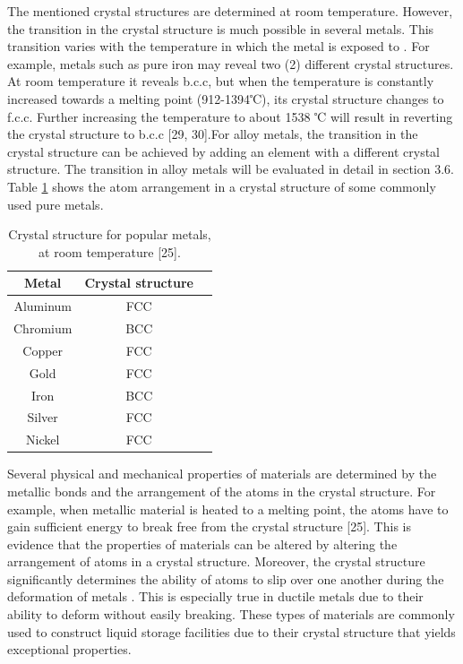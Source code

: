 \documentclass[12pt]{report}
\begin{document}
The mentioned crystal structures are determined at room temperature.  However, the transition in the crystal structure is much possible in several metals. This transition varies with the temperature in which the metal is exposed to \cite{callister2018materials}. For example, metals such as pure iron may reveal two (2) different crystal structures. At room temperature it reveals b.c.c, but when the temperature is constantly increased towards a melting point (912-1394℃), its crystal structure changes to f.c.c. Further increasing the temperature to about 1538 ℃ will result in reverting the crystal structure to b.c.c [29, 30].For alloy metals, the transition in the crystal structure can be achieved by adding an element with a different crystal structure. The transition in alloy metals will be evaluated in detail in section 3.6. Table \ref{ch3:table:structure} shows the atom arrangement in a crystal structure of some commonly used pure metals.

\begin{table}[H]
\caption{Crystal structure for popular metals, at room temperature [25].}

\centering
\begin{tabular}{ c c c }
    \hline
    Metal & Crystal structure \\
    \hline
    Aluminum & FCC \\
    Chromium & BCC \\
    Copper & FCC \\
    Gold & FCC \\
    Iron & BCC \\
    Silver & FCC \\
    Nickel & FCC \\
    \hline
\end{tabular}

\label{ch3:table:structure}
\end{table}

Several physical and mechanical properties of materials are determined by the metallic bonds and the arrangement of the atoms in the crystal structure. For example, when metallic material is heated to a melting point, the atoms have to gain sufficient energy to break free from the crystal structure [25]. This is evidence that the properties of materials can be altered by altering the arrangement of atoms in a crystal structure. Moreover, the crystal structure significantly determines the ability of atoms to slip over one another during the deformation of metals \cite{callister2018materials}. This is especially true in ductile metals due to their ability to deform without easily breaking. These types of materials are commonly used to construct liquid storage facilities due to their crystal structure that yields exceptional properties.
\end{document}
